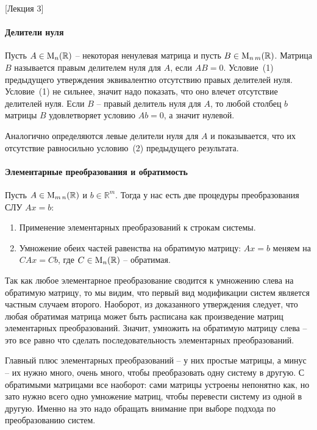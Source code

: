 [Лекция 3]

\paragraph{Делители нуля}

Пусть $A\in\operatorname{M}_{n}(\mathbb R)$ -- некоторая ненулевая матрица и пусть $B\in\operatorname{M}_{n\,m}(\mathbb R)$. Матрица $B$ называется правым делителем нуля для $A$, если $AB = 0$. Условие~(1) предыдущего утверждения эквивалентно отсутствию правых делителей нуля. Условие~(1) не сильнее, значит надо показать, что оно влечет отсутствие делителей нуля. Если $B$ -- правый делитель нуля для $A$, то любой столбец $b$ матрицы $B$ удовлетворяет условию $Ab = 0$, а значит нулевой.

Аналогично определяются левые делители нуля для $A$ и показывается, что их отсутствие равносильно условию~(2) предыдущего результата.

\paragraph{Элементарные преобразования и обратимость}

Пусть $A\in\operatorname{M}_{m\,n}(\mathbb R)$ и $b\in\mathbb R^m$. Тогда у нас есть две процедуры преобразования СЛУ $Ax = b$:
\begin{enumerate}
\item Применение элементарных преобразований к строкам системы.
\item Умножение обеих частей равенства на обратимую матрицу: $Ax=b$ меняем на $CAx = Cb$, где $C\in\operatorname{M}_{n}(\mathbb R)$ -- обратимая.
\end{enumerate}

Так как любое элементарное преобразование сводится к умножению слева на обратимую матрицу, то мы видим, что первый вид модификации систем является частным случаем второго. Наоборот, из доказанного утверждения следует, что любая обратимая матрица может быть расписана как произведение матриц элементарных преобразований. Значит, умножить на обратимую матрицу слева -- это все равно что сделать последовательность элементарных преобразований.

Главный плюс элементарных преобразований -- у них простые матрицы, а минус -- их нужно много, очень много, чтобы преобразовать одну систему в другую. С обратимыми матрицами все наоборот: сами матрицы устроены непонятно как, но зато нужно всего одно умножение матриц, чтобы перевести систему из одной в другую. Именно на это надо обращать внимание при выборе подхода по преобразованию систем.





